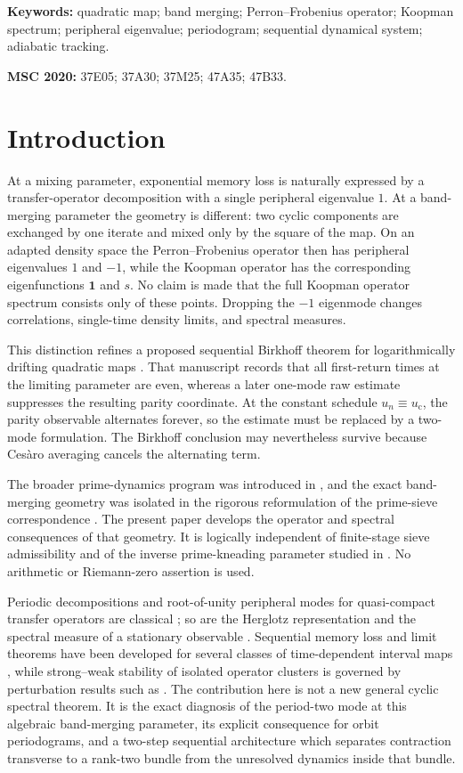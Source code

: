 \documentclass[11pt]{article}
\theoremstyle{definition}
\theoremstyle{remark}
\newcommand{\uc}{u_{\mathrm c}}
\newcommand{\one}{\mathbf 1}
\begin{document}
\noindent\textbf{Keywords:} quadratic map; band merging; Perron--Frobenius operator; Koopman spectrum; peripheral eigenvalue; periodogram; sequential dynamical system; adiabatic tracking.

\medskip
\noindent\textbf{MSC 2020:} 37E05; 37A30; 37M25; 47A35; 47B33.

\section{Introduction}

At a mixing parameter, exponential memory loss is naturally expressed by a transfer-operator decomposition with a single peripheral eigenvalue $1$.  At a band-merging parameter the geometry is different: two cyclic components are exchanged by one iterate and mixed only by the square of the map.  On an adapted density space the Perron--Frobenius operator then has peripheral eigenvalues $1$ and $-1$, while the Koopman operator has the corresponding eigenfunctions $\one$ and $s$.  No claim is made that the full Koopman operator spectrum consists only of these points.  Dropping the $-1$ eigenmode changes correlations, single-time density limits, and spectral measures.

This distinction refines a proposed sequential Birkhoff theorem for logarithmically drifting quadratic maps \citep{WangSequential2026}.  That manuscript records that all first-return times at the limiting parameter are even, whereas a later one-mode raw estimate suppresses the resulting parity coordinate.  At the constant schedule $u_n\equiv\uc$, the parity observable alternates forever, so the estimate must be replaced by a two-mode formulation.  The Birkhoff conclusion may nevertheless survive because Ces\`aro averaging cancels the alternating term.

The broader prime-dynamics program was introduced in \citet{Wang2026Published}, and the exact band-merging geometry was isolated in the rigorous reformulation of the prime-sieve correspondence \citep{WangReformulation2026}.  The present paper develops the operator and spectral consequences of that geometry.  It is logically independent of finite-stage sieve admissibility and of the inverse prime-kneading parameter studied in \citet{WangPrimeSpectrum2026}.  No arithmetic or Riemann-zero assertion is used.

Periodic decompositions and root-of-unity peripheral modes for quasi-compact transfer operators are classical \citep{Baladi2000}; so are the Herglotz representation and the spectral measure of a stationary observable \citep{CornfeldFominSinai1982}.  Sequential memory loss and limit theorems have been developed for several classes of time-dependent interval maps \citep{ConzeRaugi2007,AiminoEtAl2015}, while strong--weak stability of isolated operator clusters is governed by perturbation results such as \citet{KellerLiverani1999}.  The contribution here is not a new general cyclic spectral theorem.  It is the exact diagnosis of the period-two mode at this algebraic band-merging parameter, its explicit consequence for orbit periodograms, and a two-step sequential architecture which separates contraction transverse to a rank-two bundle from the unresolved dynamics inside that bundle.
\end{document}
